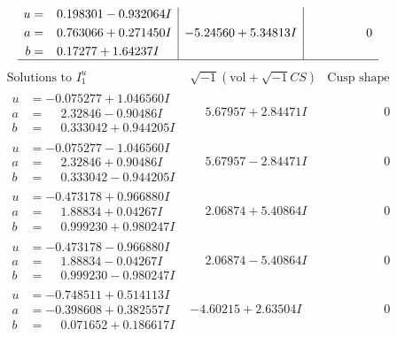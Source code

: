 \documentclass[1p]{elsarticle_modified}
\theoremstyle{definition}
\newcommand{\I}{\sqrt{-1}}
\begin{document}
$$\begin{array}{c|c|c}
\begin{aligned}
u &= \phantom{-}0.198301 - 0.932064 I \\
a &= \phantom{-}0.763066 + 0.271450 I \\
b &= \phantom{-}0.17277 + 1.64237 I\end{aligned}
 & -5.24560 + 5.34813 I & \phantom{-0.000000 } 0\\
 \hline 
 \end{array}$$\newpage$$\begin{array}{c|c|c}  
\text{Solutions to }I^u_{1}& \I (\text{vol} + \sqrt{-1}CS) & \text{Cusp shape}\\
 \hline 
\begin{aligned}
u &= -0.075277 + 1.046560 I \\
a &= \phantom{-}2.32846 - 0.90486 I \\
b &= \phantom{-}0.333042 + 0.944205 I\end{aligned}
 & \phantom{-}5.67957 + 2.84471 I & \phantom{-0.000000 } 0 \\ \hline\begin{aligned}
u &= -0.075277 - 1.046560 I \\
a &= \phantom{-}2.32846 + 0.90486 I \\
b &= \phantom{-}0.333042 - 0.944205 I\end{aligned}
 & \phantom{-}5.67957 - 2.84471 I & \phantom{-0.000000 } 0 \\ \hline\begin{aligned}
u &= -0.473178 + 0.966880 I \\
a &= \phantom{-}1.88834 + 0.04267 I \\
b &= \phantom{-}0.999230 + 0.980247 I\end{aligned}
 & \phantom{-}2.06874 + 5.40864 I & \phantom{-0.000000 } 0 \\ \hline\begin{aligned}
u &= -0.473178 - 0.966880 I \\
a &= \phantom{-}1.88834 - 0.04267 I \\
b &= \phantom{-}0.999230 - 0.980247 I\end{aligned}
 & \phantom{-}2.06874 - 5.40864 I & \phantom{-0.000000 } 0 \\ \hline\begin{aligned}
u &= -0.748511 + 0.514113 I \\
a &= -0.398608 + 0.382557 I \\
b &= \phantom{-}0.071652 + 0.186617 I\end{aligned}
 & -4.60215 + 2.63504 I & \phantom{-0.000000 } 0 \\ \hline\begin{aligned}

\end{aligned}
\end{array}$$
\end{document}
